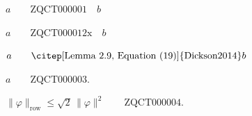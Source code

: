 \documentclass{article}
\begin{document}
$ a \qquad\text{ZQCT000001} \quad b $

$ a \qquad\text{ZQCT000012x} \quad b $

$ a \qquad\text{\citep[Lemma~2.9, Equation~(19)]{Dickson2014}} b $

$ a \qquad \text{ZQCT000003} . \label{x} $

$ \|\varphi\|_{\mathrm{row}} \le\sqrt2\,\|\varphi\|^2 \qquad\text{ZQCT000004}. $
\end{document}
